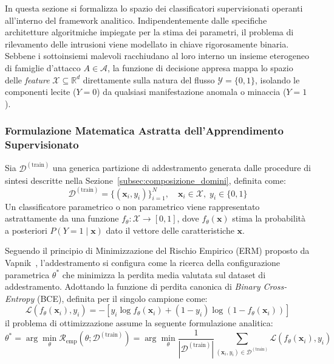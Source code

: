 In questa sezione si formalizza lo spazio dei classificatori supervisionati operanti all'interno del framework analitico. Indipendentemente dalle specifiche architetture algoritmiche impiegate per la stima dei parametri, il problema di rilevamento delle intrusioni viene modellato in chiave rigorosamente binaria. Sebbene i sottoinsiemi malevoli racchiudano al loro interno un insieme eterogeneo di famiglie d'attacco $A \in \mathcal{A}$, la funzione di decisione appresa mappa lo spazio delle \textit{feature} $\mathcal{X} \subseteq \mathbb{R}^d$ direttamente sulla natura del flusso $\mathcal{Y} = \{0, 1\}$, isolando le componenti lecite ($Y = 0$) da qualsiasi manifestazione anomala o minaccia ($Y = 1$).

\subsubsection{Formulazione Matematica Astratta dell'Apprendimento Supervisionato}
\label{subsubsec:formulazione_erm}
Sia $\mathcal{D}^{(\text{train})}$ una generica partizione di addestramento generata dalle procedure di sintesi descritte nella Sezione~\ref{subsec:composizione_domini}, definita come:
\begin{equation}
    \mathcal{D}^{(\text{train})} = \{(\mathbf{x}_i, y_i)\}_{i=1}^N, \quad \mathbf{x}_i \in \mathcal{X}, \; y_i \in \{0, 1\}
    \label{eq:train_partition_def}
\end{equation}
Un classificatore parametrico o non parametrico viene rappresentato astrattamente da una funzione $f_\theta: \mathcal{X} \rightarrow [0, 1]$, dove $f_\theta(\mathbf{x})$ stima la probabilità a posteriori $P(Y = 1 \mid \mathbf{x})$ dato il vettore delle caratteristiche $\mathbf{x}$.

Seguendo il principio di Minimizzazione del Rischio Empirico (ERM) proposto da Vapnik~\cite{vapnik1998}, l'addestramento si configura come la ricerca della configurazione parametrica $\theta^*$ che minimizza la perdita media valutata sul dataset di addestramento. Adottando la funzione di perdita canonica di \textit{Binary Cross-Entropy} (BCE), definita per il singolo campione come:
\begin{equation}
    \mathcal{L}\left(f_\theta(\mathbf{x}_i), y_i\right) = - \left[ y_i \log f_\theta(\mathbf{x}_i) + (1 - y_i) \log \left(1 - f_\theta(\mathbf{x}_i)\right) \right]
    \label{eq:bce_loss}
\end{equation}
il problema di ottimizzazione assume la seguente formulazione analitica:
\begin{equation}
    \theta^* = \arg\min_\theta \mathcal{R}_{\text{emp}}\left(\theta; \mathcal{D}^{(\text{train})}\right) = \arg\min_\theta \frac{1}{|\mathcal{D}^{(\text{train})}|} \sum_{(\mathbf{x}_i, y_i) \in \mathcal{D}^{(\text{train})}} \mathcal{L}\left(f_\theta(\mathbf{x}_i), y_i\right)
    \label{eq:erm_minimization}
\end{equation}

